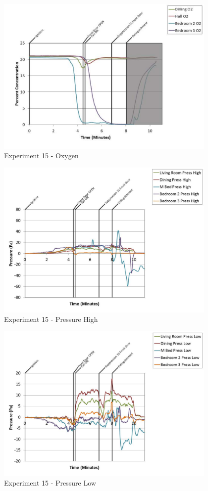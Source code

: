 \documentclass{article}
\begin{document}
\begin{appendices}
	\clearpage

	\begin{figure}[h!]
		\centering
		\includegraphics[height=3.05in]{0_Images/Results_Charts/Exp_15_Charts/Oxygen.pdf}
		\caption{Experiment 15 - Oxygen}
	\end{figure}
 

	\begin{figure}[h!]
		\centering
		\includegraphics[height=3.05in]{0_Images/Results_Charts/Exp_15_Charts/PressureHigh.pdf}
		\caption{Experiment 15 - Pressure High}
	\end{figure}
 
	\clearpage

	\begin{figure}[h!]
		\centering
		\includegraphics[height=3.05in]{0_Images/Results_Charts/Exp_15_Charts/PressureLow.pdf}
		\caption{Experiment 15 - Pressure Low}
	\end{figure}
 


\end{appendices}
\end{document}
